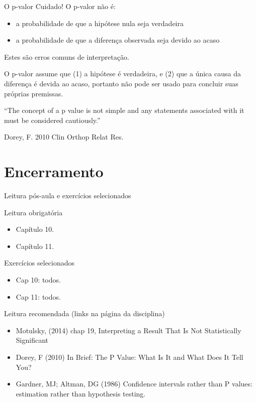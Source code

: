 \documentclass{beamer}
\begin{document}
\begin{frame}{O p-valor}
  Cuidado! O p-valor \alert{não é}:
  \begin{itemize}
  \item a probabilidade de que a hipótese nula seja verdadeira
  \item a probabilidade de que a diferença observada seja devido ao
    acaso
  \end{itemize}
  \begin{block}{}
    Estes são erros comuns de interpretação.

    O p-valor assume que (1) a hipótese é verdadeira, e (2) que a
    única causa da diferença é devida ao acaso, portanto não pode ser
    usado para concluir suas próprias premissas.
  \end{block}
  \begin{block}{}
    ``The concept of a p value is not simple and any statements
    associated with it must be considered cautiously.''

    Dorey, F. 2010 Clin Orthop Relat Res.
  \end{block}
\end{frame}

\section{Encerramento}

\begin{frame}{Leitura pós-aula e exercícios selecionados}
  \small
  \begin{block}{Leitura obrigatória}
    \begin{itemize}
    \item Capítulo 10.
    \item Capítulo 11.
    \end{itemize}
  \end{block}
  \begin{block}{Exercícios selecionados}
  \begin{itemize}
  \item Cap 10: todos.
  \item Cap 11: todos.
  \end{itemize}

\end{block}
\begin{block}{Leitura recomendada (links na página da disciplina)}
\tiny
  \begin{itemize}
  \item Motulsky, (2014) chap 19, Interpreting a Result That Is Not Statistically Significant
  \item Dorey, F (2010) In Brief: The P Value: What Is It and What Does It Tell You?
  \item Gardner, MJ; Altman, DG (1986) Confidence intervals rather than P values: estimation rather than hypothesis testing.
  \end{itemize}
\end{block}
\end{frame}
\end{document}
